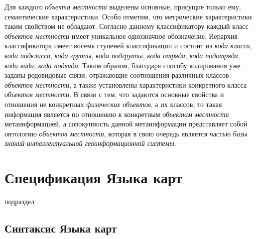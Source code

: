 Для каждого \textit{объекта местности} выделены основные, присущие только ему, семантические характеристики. Особо отметим, что метрические характеристики таким свойством не обладают.  
Согласно данному классификатору каждый класс \textit{объектов местности} имеет уникальное однозначное обозначение. Иерархия классификатора имеет восемь ступеней классификации и состоит из \textit{кода класса}, \textit{кода подкласса}, \textit{кода группы}, \textit{кода подгруппы}, \textit{кода отряда}, \textit{кода подотряда}, \textit{кода вида}, \textit{кода подвида}. Таким образом, благодаря способу кодирования уже заданы родовидовые связи, отражающие соотношения различных классов \textit{объектов местности}, а также установлены характеристики конкретного класса \textit{объектов местности}. В связи с тем, что задаются основные свойства и отношения не конкретных \textit{физических объектов}, а их классов, то такая информация является по отношению к конкретным \textit{объектам местности} метаинформацией, а совокупность данной метаинформации представляет собой онтологию \textit{объектов местности}, которая в свою очередь является частью \textit{базы знаний} \textit{интеллектуальной геоинформационной системы}.

\section{Спецификация Языка карт}
\label{chapter_gis_sec_map_specification}

\begin{SCn}
\begin{scnrelfromlist}{подраздел}
\end{scnrelfromlist}
\end{SCn}

\subsection{Синтаксис Языка карт}
\label{chapter_gis_sec_map_syntax}

